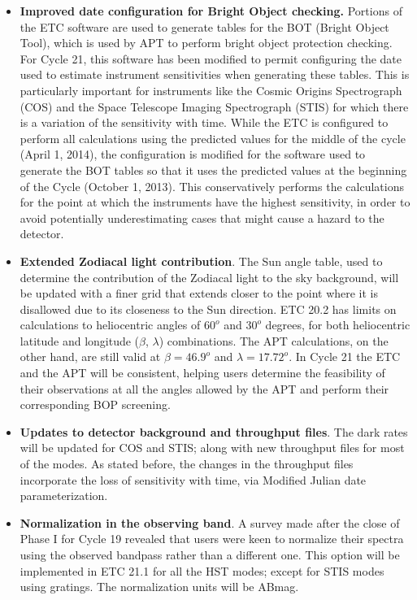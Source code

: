 \begin{itemize}
\item {\bf{ Improved date configuration for Bright Object checking.}}
Portions of the ETC software are used to generate tables for the BOT (Bright Object Tool), which is used by APT to perform bright object protection checking. For Cycle 21, this software has been modified to permit configuring the date used to estimate instrument sensitivities when generating these tables.  This is particularly important for instruments like the Cosmic Origins Spectrograph (COS) and the Space Telescope Imaging Spectrograph (STIS) for which there is a variation of the sensitivity with time. While the ETC is configured to perform all calculations using the predicted values for the middle of the cycle (April 1, 2014), the configuration is modified for the software used to generate the BOT tables so that it uses the predicted values at the beginning of the Cycle (October 1, 2013). This conservatively performs the calculations for the point at which the instruments have the highest sensitivity, in order to avoid potentially underestimating cases that might cause a hazard to the detector.

\item {\bf { Extended Zodiacal light contribution}}.
The Sun angle table, used to determine the contribution of the  Zodiacal light to the sky background, will be updated with a finer grid that extends closer to  the point where it is disallowed due to its closeness to the Sun direction. ETC 20.2 has limits on calculations to heliocentric angles of $60^o$ and $30^o$ degrees, for both heliocentric latitude and longitude ($\beta$, $\lambda$) combinations. The APT calculations, on the other hand, are still valid at  $\beta = 46.9^o$ and $\lambda = 17.72^o$. In Cycle 21  the ETC and the APT will be consistent, helping users determine the feasibility of their observations at all the angles allowed by the APT and perform their corresponding BOP screening.

\item {\bf Updates to detector background and throughput files}.
The dark rates will be updated for COS and STIS;  along with new  throughput files for most of the modes. As stated before, the changes in the throughput files incorporate the loss of sensitivity with time, via Modified Julian date parameterization.

\item {\bf Normalization in the observing band}.
A survey made after the close of Phase I for Cycle 19 revealed that users were keen to normalize their spectra using the observed bandpass rather than a different one. This option will be implemented in ETC 21.1 for all the HST modes; except for STIS modes using gratings. The normalization units will be ABmag.


\end{itemize}

